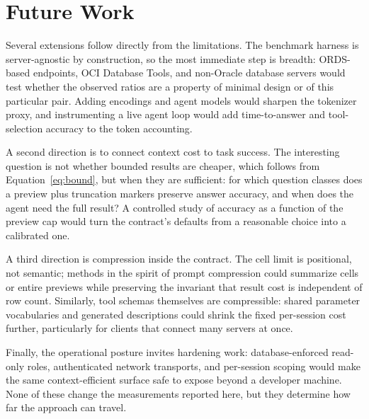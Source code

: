 \section{Future Work}\label{sec:future-work}

Several extensions follow directly from the limitations. The benchmark harness is server-agnostic by construction, so the most immediate step is breadth: ORDS-based endpoints, OCI Database Tools, and non-Oracle database servers would test whether the observed ratios are a property of minimal design or of this particular pair. Adding encodings and agent models would sharpen the tokenizer proxy, and instrumenting a live agent loop would add time-to-answer and tool-selection accuracy to the token accounting.

A second direction is to connect context cost to task success. The interesting question is not whether bounded results are cheaper, which follows from Equation~\ref{eq:bound}, but when they are sufficient: for which question classes does a preview plus truncation markers preserve answer accuracy, and when does the agent need the full result? A controlled study of accuracy as a function of the preview cap would turn the contract's defaults from a reasonable choice into a calibrated one.

A third direction is compression inside the contract. The cell limit is positional, not semantic; methods in the spirit of prompt compression could summarize cells or entire previews while preserving the invariant that result cost is independent of row count. Similarly, tool schemas themselves are compressible: shared parameter vocabularies and generated descriptions could shrink the fixed per-session cost further, particularly for clients that connect many servers at once.

Finally, the operational posture invites hardening work: database-enforced read-only roles, authenticated network transports, and per-session scoping would make the same context-efficient surface safe to expose beyond a developer machine. None of these change the measurements reported here, but they determine how far the approach can travel.
